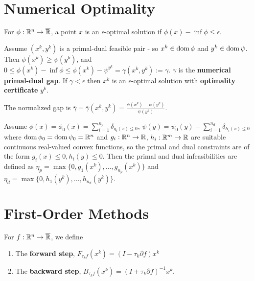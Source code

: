 \section{Numerical Optimality}
\label{sec:numerical-optimality}

\begin{defn}
  \label{sec:numerical-optimality-1}
  For $\phi: \mathbb{R}^{n} \rightarrow \overline {\mathbb{R}}$, a point $x$ is an
  $\epsilon$-optimal solution if $\phi(x) - \inf \phi \leq \epsilon$.
\end{defn}

\begin{defn}
  \label{sec:numerical-optimality-2}
  Assume $(x^{k}, y^{k})$ is a primal-dual feasible pair - so $x^{k}
  \in \operatorname*{dom} \phi$ and $y^{k} \in \operatorname*{dom} \psi$.  Then $\phi(x^{k}) \geq
  \psi(y^{k})$, and $0 \leq \phi(x^{k}) - \inf \phi \leq \phi(x^{k}) -
  \psi^{y^{k}} = \gamma(x^{k}, y^{k}) := \gamma$.  $\gamma$ is the
  \textbf{numerical primal-dual gap}.  If $\gamma < \epsilon$ then
  $x^{k}$ is an $\epsilon$-optimal solution with \textbf{optimality
    certificate} $y^{k}$.

  The normalized gap is $\overline \gamma = \overline \gamma(x^{k},
  y^{k}) = \frac{\phi(x^{k}) - \psi(y^{k})}{\psi(y^{k})}$.
\end{defn}

\begin{defn}
  \label{sec:numerical-optimality-3}
  Assume $\phi(x) = \phi_{0}(x) = \sum_{i=1}^{n_{p}} \delta_{g_{i}(x)
    \leq 0}$, $\psi(y) = \psi_{0}(y) - \sum_{i=1}^{n_{d}}
  \delta_{h_{i}(x) \leq 0}$ where $\operatorname*{dom} \phi_{0} = \operatorname*{dom} \psi_{0} =
  \mathbb{R}^{n}$ and $g_{i}: \mathbb{R}^{n} \rightarrow \mathbb{R}$, $h_{i}: \mathbb{R}^{m}
  \rightarrow \mathbb{R}$ are suitable continuous real-valued convex
  functions, so the primal and dual constraints are of the form
  $g_{i}(x) \leq 0, h_{i}(y) \leq 0$. Then the primal and dual
  infeasibilities are defined as $\eta_{p} = \max \{ 0, g_{1}(x^{k}),
  \dots, g_{n_{p}}(x^{k}) \} $ and $\eta_{d} = \max \{ 0,
  h_{1}(y^{k}), \dots, h_{n_{d}}(y^{k}) \} $.
\end{defn}

\section{First-Order Methods}
\label{sec:first-order-methods}

\begin{defn}
  \label{sec:first-order-methods-1}
  For $f: \mathbb{R}^{n} \rightarrow \overline {\mathbb{R}}$, we define
  \begin{enumerate}
  \item The \textbf{forward step}, $F_{\tau_{k} f}(x^{k}) = (I -
    \tau_{k} \partial f) x^{k}$
  \item The \textbf{backward step}, $B_{\tau_{k}f}(x^{k}) = (I +
    \tau_{k} \partial f)^{-1} x^{k}$.
  \end{enumerate}
\end{defn}


